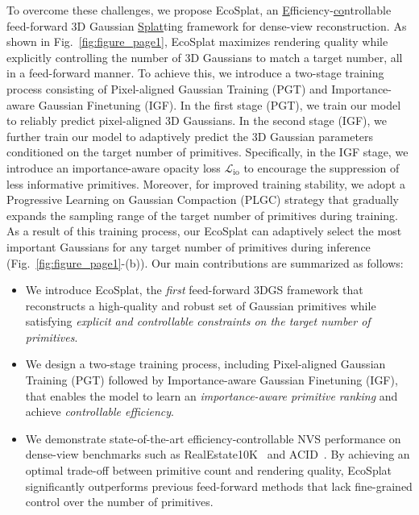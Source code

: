 To overcome these challenges, we propose EcoSplat, an \underline{E}fficiency-\underline{co}ntrollable feed-forward 3D Gaussian \underline{Splat}ting framework for dense-view reconstruction. As shown in Fig.~\ref{fig:figure_page1}, EcoSplat maximizes rendering quality while explicitly controlling the number of 3D Gaussians to match a target number, all in a feed-forward manner. To achieve this, we introduce a two-stage training process consisting of Pixel-aligned Gaussian Training (PGT) and Importance-aware Gaussian Finetuning (IGF). In the first stage (PGT), we train our model to reliably predict pixel-aligned 3D Gaussians. In the second stage (IGF), we further train our model to adaptively predict the 3D Gaussian parameters conditioned on the target number of primitives. Specifically, in the IGF stage, we introduce an importance-aware opacity loss $\mathcal{L}_\text{io}$ to encourage the suppression of less informative primitives. Moreover, for improved training stability, we adopt a Progressive Learning on Gaussian Compaction (PLGC) strategy that gradually expands the sampling range of the target number of primitives during training. As a result of this training process, our EcoSplat can adaptively select the most important Gaussians for any target number of primitives during inference (Fig.~\ref{fig:figure_page1}-(b)). Our main contributions are summarized as follows:
\begin{itemize}
  \setlength\itemsep{0.1cm}
  \item We introduce EcoSplat, the \textit{first} feed-forward 3DGS framework that reconstructs a high-quality and robust set of Gaussian primitives while satisfying \textit{explicit and controllable constraints on the target number of primitives}.
  \item We design a two-stage training process, including {Pixel-aligned Gaussian Training (PGT)} followed by {Importance-aware Gaussian Finetuning (IGF)}, that enables the model to learn an \textit{importance-aware primitive ranking} and achieve \textit{controllable efficiency}.
  \item We demonstrate state-of-the-art efficiency-controllable NVS performance on dense-view benchmarks such as RealEstate10K~\cite{zhou2018stereo} and ACID~\cite{infinite_nature_2020}. By achieving an optimal trade-off between primitive count and rendering quality, EcoSplat significantly outperforms previous feed-forward methods that lack fine-grained control over the number of primitives.
\end{itemize}




